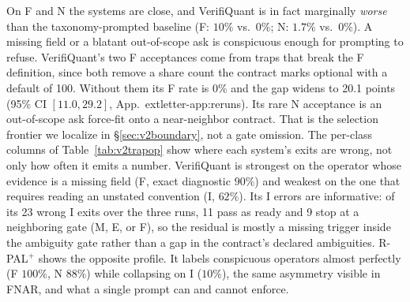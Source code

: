 \documentclass[sigconf]{acmart}
\newif\ifarxiv
\newcommand{\extref}[1]{App.~\ifarxiv\ref{#1}\else\csname extletter-#1\endcsname\fi}
\begin{document}
On F and N the systems are close, and VerifiQuant is in fact marginally \emph{worse} than the taxonomy-prompted baseline (F: $10\%$ vs.\ $0\%$; N: $1.7\%$ vs.\ $0\%$). A missing field or a blatant out-of-scope ask is conspicuous enough for prompting to refuse. VerifiQuant's two F acceptances come from traps that break the F definition, since both remove a share count the contract marks optional with a default of 100. Without them its F rate is $0\%$ and the gap widens to 20.1 points (95\% CI $[11.0, 29.2]$, \extref{app:reruns}). Its rare N acceptance is an out-of-scope ask force-fit onto a near-neighbor contract.
That is the selection frontier we localize in \S\ref{sec:v2boundary}, not a gate omission.
The per-class columns of Table~\ref{tab:v2trapop} show where each system's exits are wrong, not only how often it emits a number. VerifiQuant is strongest on the operator whose evidence is a missing field (F, exact diagnostic $90\%$) and weakest on the one that requires reading an unstated convention (I, $62\%$). Its I errors are informative: of its 23 wrong I exits over the three runs, 11 pass as ready and 9 stop at a neighboring gate (M, E, or F), so the residual is mostly a missing trigger inside the ambiguity gate rather than a gap in the contract's declared ambiguities. R-PAL$^{+}$ shows the opposite profile. It labels conspicuous operators almost perfectly (F $100\%$, N $88\%$) while collapsing on I ($10\%$), the same asymmetry visible in FNAR, and what a single prompt can and cannot enforce.
\end{document}
